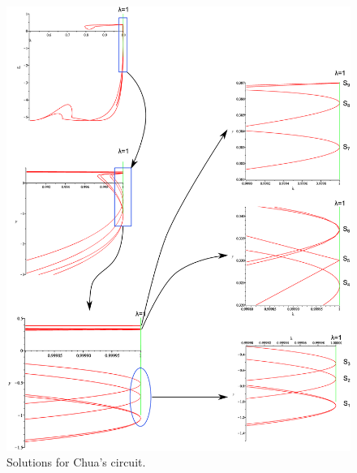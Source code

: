\documentclass[journal,twocolumn]{IEEEtran}
\begin{document}
\begin{figure}[hbtp]
\centering
\includegraphics[scale=0.19]{nh3figs/chua_9sol_complete.eps}
\caption{Solutions for Chua's circuit.}
\label{chuaf}
\end{figure}



\end{document}
